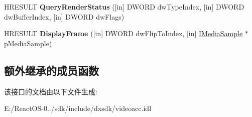 \begin{DoxyCompactItemize}
\item 
\mbox{\label{interface_i_a_m_video_accelerator_afb34954b1b4bd9c9357e54d76a16c0e6}} 
H\+R\+E\+S\+U\+LT {\bfseries Query\+Render\+Status} (\mbox{[}in\mbox{]} D\+W\+O\+RD dw\+Type\+Index, \mbox{[}in\mbox{]} D\+W\+O\+RD dw\+Buffer\+Index, \mbox{[}in\mbox{]} D\+W\+O\+RD dw\+Flags)
\item 
\mbox{\label{interface_i_a_m_video_accelerator_a146c9f54ec82437c58080d1dbc9ebcb2}} 
H\+R\+E\+S\+U\+LT {\bfseries Display\+Frame} (\mbox{[}in\mbox{]} D\+W\+O\+RD dw\+Flip\+To\+Index, \mbox{[}in\mbox{]} \hyperlink{interface_i_media_sample}{I\+Media\+Sample} $\ast$p\+Media\+Sample)
\end{DoxyCompactItemize}
\subsection*{额外继承的成员函数}


该接口的文档由以下文件生成\+:\begin{DoxyCompactItemize}
\item 
E\+:/\+React\+O\+S-\/0../sdk/include/dxsdk/videoacc.\+idl\end{DoxyCompactItemize}
